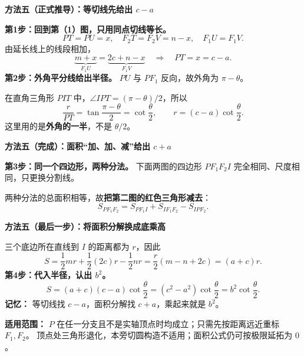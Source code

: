 \clearpage
\begin{proofbox}
\textbf{\textcolor{CProof}{方法五（正式推导）：等切线先给出 $c-a$}}

\textbf{第1步：回到第（1）图，只用同点切线等长。}
\[
PT=PU=x,\quad F_2T=F_2V=n-x,\quad F_1U=F_1V.
\]
由延长线上的线段相加，
\[
\underbrace{m+x}_{F_1U}=\underbrace{2c+n-x}_{F_1V}
\quad\Longrightarrow\quad
\boxed{PT=x=c-a}.
\]
\textbf{第2步：外角平分线给出半径。} $PU$ 与 $PF_1$ 反向，故外角为 $\pi-\theta$。

在直角三角形 $PIT$ 中，$\angle IPT=(\pi-\theta)/2$，所以
\[
\frac r{PT}=\tan\frac{\pi-\theta}{2}=\cot\frac\theta2,
\qquad \boxed{r=(c-a)\cot\frac\theta2}.
\]
这里用的是\textbf{外角的一半}，不是 $\theta/2$。
\end{proofbox}

\clearpage
\begin{proofbox}
\textbf{\textcolor{CProof}{方法五（完成）：面积“加、加、减”给出 $c+a$}}

\textbf{第3步：同一个四边形，两种分法。} 下面两图的四边形 $PF_1F_2I$ 完全相同、尺度相同，只更换分割线。


两种分法的总面积相等，故\textbf{把第二图的红色三角形减去}：
\[
S_{PF_1F_2}=S_{PF_1I}+S_{IF_1F_2}-S_{IPF_2}.
\]
\end{proofbox}
\clearpage
\begin{proofbox}
\textbf{\textcolor{CProof}{方法五（最后一步）：将面积分解换成底乘高}}

三个底边所在直线到 $I$ 的距离都为 $r$，因此
\[
S=\frac12 mr+\frac12(2c)r-\frac12 nr
 =\frac r2(m-n+2c)=\boxed{(a+c)r}.
\]
\textbf{第4步：代入半径，认出 $b^2$。}
\[
S=(a+c)(c-a)\cot\frac\theta2
=(c^2-a^2)\cot\frac\theta2
=\boxed{b^2\cot\frac\theta2}.
\]
\textbf{记忆：} 等切线找 $c-a$，面积分解找 $c+a$，乘起来就是 $b^2$。

\textbf{适用范围：} $P$ 在任一分支且不是实轴顶点时均成立；只需先按距离远近重标 $F_1,F_2$。
顶点处三角形退化，本旁切圆构造不适用；面积公式仍可按极限延拓为 $0$。
\end{proofbox}
